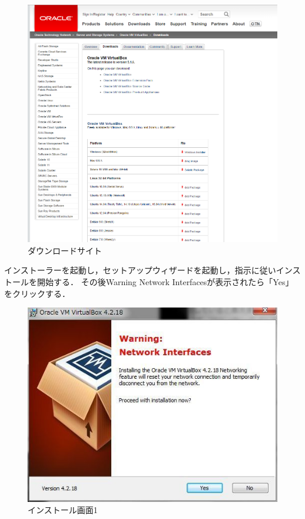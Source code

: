 \begin{figure}[htb]
\centering
\includegraphics[width=15cm]{oracle.png}
\caption{ダウンロードサイト}\label{virtualboxダウンロードサイトの画像}
\end{figure}

\clearpage

インストーラーを起動し，セットアップウィザードを起動し，指示に従いインストールを開始する．
その後Warning Network Interfacesが表示されたら「Yes」をクリックする．

\begin{figure}[htb]
\centering
\includegraphics[width=15cm]{setup1.png}
\caption{インストール画面1}\label{virtualboxインストール画面1}
\end{figure}

